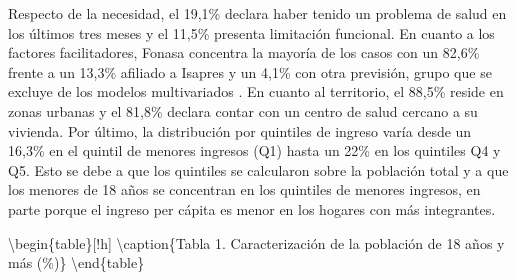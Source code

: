 \documentclass[
  spanish,
  a4paper,
  oneside]{scrbook}
\begin{document}
Respecto de la necesidad, el 19,1\% declara haber tenido un problema de
salud en los últimos tres meses y el 11,5\% presenta limitación
funcional. En cuanto a los factores facilitadores, Fonasa concentra la
mayoría de los casos con un 82,6\% frente a un 13,3\% afiliado a Isapres
y un 4,1\% con otra previsión, grupo que se excluye de los modelos
multivariados . En cuanto al territorio, el 88,5\% reside en zonas
urbanas y el 81,8\% declara contar con un centro de salud cercano a su
vivienda. Por último, la distribución por quintiles de ingreso varía
desde un 16,3\% en el quintil de menores ingresos (Q1) hasta un 22\% en
los quintiles Q4 y Q5. Esto se debe a que los quintiles se calcularon
sobre la población total y a que los menores de 18 años se concentran en
los quintiles de menores ingresos, en parte porque el ingreso per cápita
es menor en los hogares con más integrantes.

\textbackslash begin\{table\}{[}!h{]} \centering
\textbackslash caption\{\label{tab:unnamed-chunk-2}Tabla 1.
Caracterización de la población de 18 años y más (\%)\} \centering
{} \textbackslash end\{table\}
\end{document}

